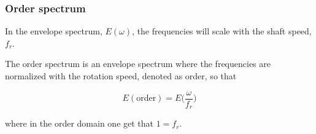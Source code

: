 \begin{frame}
    \frametitle{Order spectrum}
    \small
    
    In the envelope spectrum, $E(\omega)$, the frequencies will scale with the shaft speed, $f_r$.  
    
    The order spectrum is an envelope spectrum where the frequencies are normalized with the rotation speed, denoted as order, so that
    
    \begin{equation}
        E(\text{order}) = E\Big(\frac{\omega}{f_r}\Big)
    \end{equation}
    
    where in the order domain one get that $1 = f_r$.   
\end{frame}